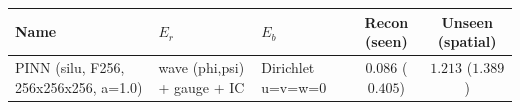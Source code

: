 \begin{center}
\begin{tabular}{lll cc}
\toprule
Name & $E_r$ & $E_b$ & Recon (seen) & Unseen (spatial) \\
\midrule
PINN (silu, F256, 256x256x256, a=1.0) & wave (phi,psi) + gauge + IC & Dirichlet u=v=w=0 & $0.086$ ($0.405$) & $1.213$ ($1.389$) \\
\bottomrule
\end{tabular}
\end{center}

